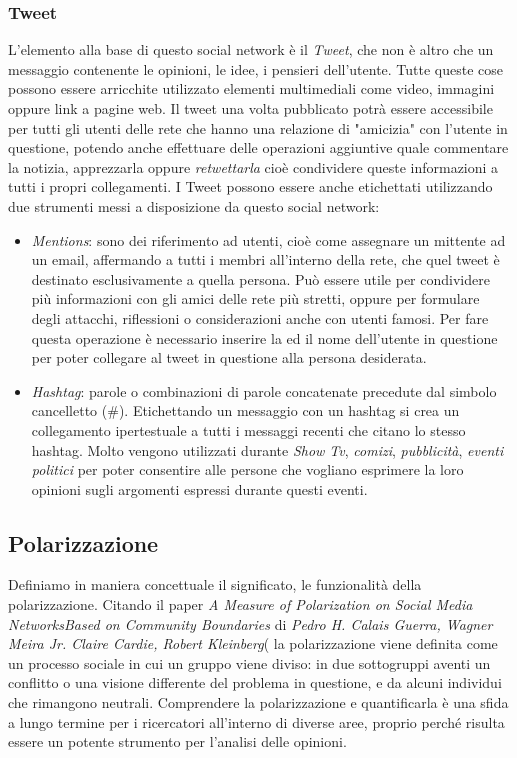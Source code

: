 \subsubsection{Tweet}
L'elemento alla base di questo social network è il \textit{Tweet}, che non è altro che un messaggio contenente le opinioni, le idee, i pensieri dell'utente. Tutte queste cose possono essere arricchite utilizzato elementi multimediali come video, immagini oppure link a pagine web. Il tweet una volta pubblicato potrà essere accessibile per tutti gli utenti delle rete che hanno una relazione di "amicizia" con l'utente in questione, potendo anche effettuare delle operazioni aggiuntive quale commentare la notizia, apprezzarla oppure \textit{retwettarla} cioè condividere queste informazioni a tutti i propri collegamenti.
I Tweet possono essere anche etichettati utilizzando due strumenti messi a disposizione da questo social network:
\begin{itemize}
\item \textit{Mentions}: sono dei riferimento ad utenti, cioè come assegnare un mittente ad un email, affermando a tutti i membri all'interno della rete, che quel tweet è destinato esclusivamente a quella persona. Può essere utile per condividere più informazioni con gli amici delle rete più stretti, oppure per formulare degli attacchi, riflessioni o considerazioni anche con utenti famosi. Per fare questa operazione è necessario inserire la \@ ed il nome dell'utente in questione per poter collegare al tweet in questione alla persona desiderata.
\item \textit{Hashtag}: parole o combinazioni di parole concatenate precedute dal simbolo cancelletto (\#).
Etichettando un messaggio con un hashtag si crea un collegamento ipertestuale a tutti i messaggi recenti che citano lo stesso hashtag. Molto  vengono utilizzati durante \textit{Show Tv}, \textit{comizi}, \textit{pubblicità}, \textit{eventi politici} per poter consentire alle persone che vogliano esprimere la loro opinioni sugli argomenti espressi durante questi eventi. 

\end{itemize}

\subsection{Polarizzazione}
Definiamo in maniera concettuale il significato, le funzionalità della polarizzazione. 
Citando il paper \textit{A Measure of Polarization on Social Media NetworksBased on Community Boundaries} di \textit{Pedro H. Calais Guerra, Wagner Meira Jr. Claire Cardie, Robert Kleinberg}(\cite{Guerra2015polarization} la polarizzazione viene definita come un processo sociale in cui un gruppo viene diviso: 
in due sottogruppi aventi un conflitto o una visione differente del problema in questione, e da alcuni individui che rimangono neutrali.
Comprendere la polarizzazione e quantificarla è una sfida a lungo termine per i ricercatori all'interno di diverse aree, proprio perché risulta essere un potente strumento per l'analisi delle opinioni.


